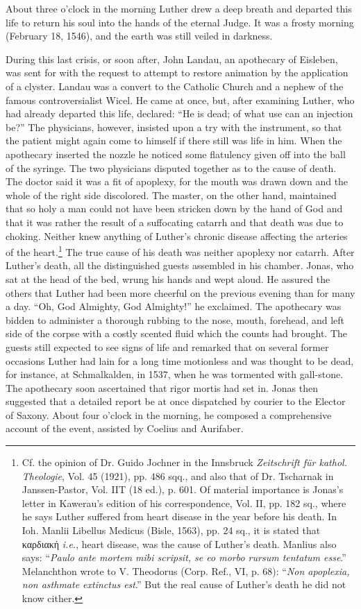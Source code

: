 About three o’clock in the morning Luther drew a deep breath and
departed this life to return his soul into the hands of the eternal
Judge. It was a frosty morning (February 18, 1546), and the earth
was still veiled in darkness.

During this last crisis, or soon after, John Landau, an apothecary
of Eisleben, was sent for with the request to attempt to restore animation
by the application of a clyster. Landau was a convert to the
Catholic Church and a nephew of the famous controversialist Wicel.
He came at once, but, after examining Luther, who had already departed
this life, declared: “He is dead; of what use can an injection
be?” The physicians, however, insisted upon a try with the instrument,
so that the patient might again come to himself if there still
was life in him. When the apothecary inserted the nozzle he noticed
some flatulency given off into the ball of the syringe. The two physicians
disputed together as to the cause of death. The doctor said
it was a fit of apoplexy, for the mouth was drawn down and the
whole of the right side discolored. The master, on the other hand,
maintained that so holy a man could not have been stricken down
by the hand of God and that it was rather the result of a suffocating
catarrh and that death was due to choking. Neither knew anything of
Luther’s chronic disease affecting the arteries of the heart.\footnote
{Cf. the opinion of Dr. Guido Jochner in the Innsbruck \textit{Zeitschrift für kathol. Theologie},
Vol. 45 (1921), pp. 486 sqq., and also that of Dr. Tscharnak in Janssen-Pastor, Vol.
IIT (18 ed.), p. 601. Of material importance is Jonas’s letter in Kawerau’s edition of his
correspondence, Vol. II, pp. 182 sq., where he says Luther suffered from heart disease in
the year before his death. In Ioh. Manlii Libellus Medicus (Bisle, 1563), pp. 24 sq., it
is stated that
καρδιακή
\textit{i.e.}, heart disease, was the cause of Luther’s death. Manlius also says:
“\textit{Paulo ante mortem mibi scripsit, se eo morbo rursum tentatum esse}.” Melanchthon wrote
to V. Theodorus (Corp. Ref., VI, p. 68): “\textit{Non apoplexia, non asthmate extinctus est}.”
But the real cause of Luther’s death he did not know cither.}
The true
cause of his death was neither apoplexy nor catarrh.
After Luther’s death, all the distinguished guests assembled in his
chamber. Jonas, who sat at the head of the bed, wrung his hands
and wept aloud. He assured the others that Luther had been more
cheerful on the previous evening than for many a day. “Oh, God
Almighty, God Almighty!” he exclaimed. The apothecary was bidden to administer
a thorough rubbing to the nose, mouth, forehead,
and left side of the corpse with a costly scented fluid which the counts
had brought. The guests still expected to see signs of life and remarked
that on several former occasions Luther had lain for a long
time motionless and was thought to be dead, for instance, at Schmalkalden,
in 1537, when he was tormented with gall-stone. The apothecary soon
ascertained that rigor mortis had set in. Jonas then suggested
that a detailed report be at once dispatched by courier to the Elector
of Saxony. About four o’clock in the morning, he composed a comprehensive
account of the event, assisted by Coelius and Aurifaber.


